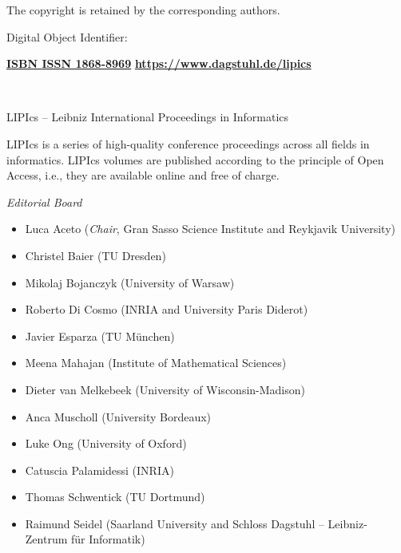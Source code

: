 \documentclass[a4paper,UKenglish]{lipicsmaster-v2021}
\begin{document}
\begin{publicationinfo}
\smallskip

The copyright is retained by the corresponding authors.

\bigskip
\bigskip
\bigskip
\bigskip

Digital Object Identifier: \href{https://doi.org/\printDOI}{\printDOI}

\vfill
\textbf{\href{https://www.dagstuhl.de/dagpub/\printISBN}{ISBN \printISBN}}\qquad \qquad \textbf{\href{https://www.dagstuhl.de/dagpub/1868-8969}{ISSN 1868-8969}}  \hfill \textbf{\href{https://www.dagstuhl.de/lipics}{https://www.dagstuhl.de/lipics}}


\newpage

\ \\
\bigskip
\bigskip
\bigskip

{\Large LIPIcs -- Leibniz International Proceedings in Informatics}

\bigskip

LIPIcs is a series of high-quality conference proceedings across all fields in informatics. 
LIPIcs volumes are published according to the principle of Open Access, i.e., they are available online and free of charge. 

\bigskip
\bigskip
\bigskip

\emph{Editorial Board}

\begin{itemize} 
\item Luca Aceto (\emph{Chair}, Gran Sasso Science Institute and Reykjavik University) 
\item Christel Baier (TU Dresden)
\item Mikolaj Bojanczyk (University of Warsaw)
\item Roberto Di Cosmo (INRIA and University Paris Diderot)
\item Javier Esparza (TU M\"unchen)
\item Meena Mahajan (Institute of Mathematical Sciences)
\item Dieter van Melkebeek (University of Wisconsin-Madison)
\item Anca Muscholl (University Bordeaux)
\item Luke Ong (University of Oxford)
\item Catuscia Palamidessi (INRIA)
\item Thomas Schwentick (TU Dortmund)
\item Raimund Seidel (Saarland University and Schloss Dagstuhl -- Leibniz-Zentrum f\"ur Informatik)
\end{itemize}



\end{publicationinfo}
\end{document}

